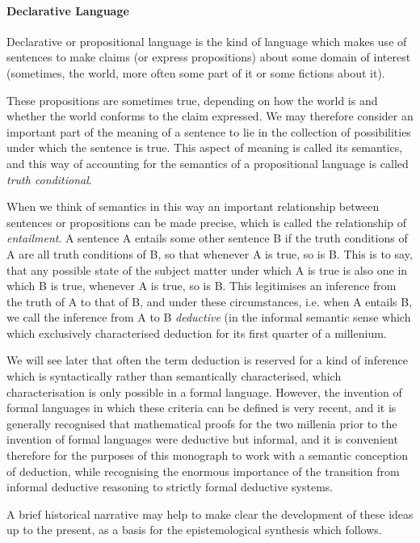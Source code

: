 \documentclass[10pt,titlepage]{book}
\begin{document}
\paragraph{Declarative Language}

Declarative or propositional language is the kind of language which makes use of sentences to make claims (or express propositions) about some domain of interest (sometimes, the world, more often some part of it or some fictions about it).

These propositions are sometimes true, depending on how the world is and whether the world conforms to the claim expressed.
We may therefore consider an important part of the meaning of a sentence to lie in the collection of possibilities under which the sentence is true.
This aspect of meaning is called its semantics, and this way of accounting for the semantics of a propositional language is called \emph{truth conditional}.

When we think of semantics in this way an important relationship between sentences or propositions can be made precise, which is called the relationship of \emph{entailment}.
A sentence A entails some other sentence B if the truth conditions of A are all truth conditions of B, so that whenever A is true, so is B.
This is to say, that any possible state of the subject matter under which A is true is also one in which B is true, whenever A is true, so is B.
This legitimises an inference from the truth of A to that of B, and under these circumstances, i.e. when A entails B, we call the inference from A to B \emph{deductive} (in the informal semantic sense which which exclusively characterised deduction for its first quarter of a millenium.

We will see later that often the term deduction is reserved for a kind of inference which is syntactically rather than semantically characterised, which characterisation is only possible in a formal language.
However, the invention of formal languages in which these criteria can be defined is very recent, and it is generally recognised that mathematical proofs for the two millenia prior to the invention of formal languages were deductive but informal, and it is convenient therefore for the purposes of this monograph to work with a semantic conception of deduction, while recognising the enormous importance of the transition from informal deductive reasoning to strictly formal deductive systems.

A brief historical narrative may help to make clear the development of these ideas up to the present, as a basis for the epistemological synthesis which follows.
\end{document}

